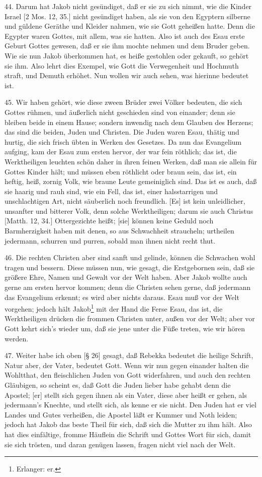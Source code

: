 44. Darum hat Jakob nicht gesündiget, daß er sie zu sich nimmt, wie die Kinder Israel [2 Mos. 12, 35.] nicht gesündiget haben, als sie von den Egyptern silberne und güldene Geräthe und Kleider nahmen, wie sie Gott geheißen hatte. Denn die Egypter waren Gottes, mit allem, was sie hatten. Also ist auch des Esau erste Geburt Gottes gewesen, daß er sie ihm mochte nehmen und dem Bruder geben. Wie sie nun Jakob überkommen hat, es heiße gestohlen oder gekauft, so gehört sie ihm. Also lehrt dies Exempel, wie Gott die Verwegenheit und Hochmuth straft, und Demuth erhöhet. Nun wollen wir auch sehen, was hierinne bedeutet ist.

45. Wir haben gehört, wie diese zween Brüder zwei Völker bedeuten, die sich Gottes rühmen, und äußerlich nicht geschieden sind von einander; denn sie bleiben beide in einem Hause; sondern inwendig nach dem Glauben des Herzens; das sind die beiden, Juden und Christen. Die Juden waren Esau, thätig und hurtig, die sich frisch übten in Werken des Gesetzes. Da nun das Evangelium aufging, kam der Esau zum ersten hervor, der war fein röthlich; das ist, die Werktheiligen leuchten schön daher in ihren feinen Werken, daß man sie allein für Gottes Kinder hält; und müssen eben röthlicht oder braun sein, das ist, ein heftig, heiß, zornig Volk, wie braune Leute gemeiniglich sind. Das ist es auch, daß sie haarig und rauh sind, wie ein Fell, das ist, einer halsstarrigen und unschlachtigen Art, nicht säuberlich noch freundlich. [Es] ist kein unleidlicher, unsanfter und bitterer Volk, denn solche Werktheiligen; darum sie auch Christus [Matth. 12, 34.] Ottergezichte heißt; [sie] können keine Geduld noch Barmherzigkeit haben mit denen, so aus Schwachheit straucheln; urtheilen jedermann, schurren und purren, sobald man ihnen nicht recht thut.

46. Die rechten Christen aber sind sanft und gelinde, können die Schwachen wohl tragen und bessern. Diese müssen nun, wie gesagt, die Erstgebornen sein, daß sie größere Ehre, Namen und Gewalt vor der Welt haben. Aber Jakob wollte auch gerne am ersten hervor kommen; denn die Christen sehen gerne, daß jedermann das Evangelium erkennt; es wird aber nichts daraus. Esau muß vor der Welt vorgehen; jedoch hält Jakob\footnote{Erlanger: er.} mit der Hand die Ferse Esau, das ist, die Werktheiligen drücken die frommen Christen unter, außen vor der Welt; aber vor Gott kehrt sich's wieder um, daß sie jene unter die Füße treten, wie wir hören werden.

47. Weiter habe ich oben [§ 26] gesagt, daß Rebekka bedeutet die heilige Schrift, Natur aber, der Vater, bedeutet Gott. Wenn wir nun gegen einander halten die Wohltthat, den fleischlichen Juden von Gott widerfahren, und auch den rechten Gläubigen, so scheint es, daß Gott die Juden lieber habe gehabt denn die Apostel; [er] stellt sich gegen ihnen als ein Vater, diese aber heißt er gehen, als jedermann's Knechte, und stellt sich, als kenne er sie nicht. Den Juden hat er viel Landes und Gutes verheißen, die Apostel läßt er Kummer und Noth leiden; jedoch hat Jakob das beste Theil für sich, daß sich die Mutter zu ihm hält. Also hat dies einfältige, fromme Häuflein die Schrift und Gottes Wort für sich, damit sie sich trösten, und daran genügen lassen, fragen nicht viel nach der Welt.

